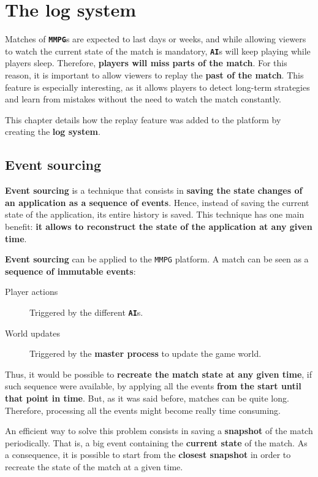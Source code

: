 \documentclass[a4paper,11pt,titlepage,abstract,numbers=noenddot,automark,mnsy,intlimits,rgb,dvipsnames]{report}
\begin{document}
\chapter{The log system}
\label{log_system}
Matches of \textbf{\texttt{MMPG}}s are expected to last days or weeks, and while allowing viewers to watch the current state of
the match is mandatory, \textbf{\texttt{AI}}s will keep playing while players sleep. Therefore, \textbf{players will miss parts of the match}.
For this reason, it is important to allow viewers to replay the \textbf{past of the match}. This feature is especially
interesting, as it allows players to detect long-term strategies and learn from mistakes without the need to watch the
match constantly.

This chapter details how the replay feature was added to the platform by creating the \textbf{log system}.
\section{Event sourcing}
\textbf{Event sourcing} \cite{event_sourcing} is a technique that consists in \textbf{saving the state changes of an application as a
sequence of events}. Hence, instead of saving the current state of the application, its entire history is saved. This technique
has one main benefit: \textbf{it allows to reconstruct the state of the application at any given time}.

\textbf{Event sourcing} can be applied to the \texttt{MMPG} platform. A match can be seen as a \textbf{sequence of immutable events}:
\begin{description}
\item[Player actions]
Triggered by the different \textbf{\texttt{AI}}s.
\item[World updates]
Triggered by the \textbf{master process} to update the game world.
\end{description}
Thus, it would be possible to \textbf{recreate the match state at any given time}, if such sequence were available, by applying
all the events \textbf{from the start until that point in time}. But, as it was said before, matches can be quite long. Therefore,
processing all the events might become really time consuming.

An efficient way to solve this problem consists in saving a \textbf{snapshot} of the match periodically. That is, a big event
containing the \textbf{current state} of the match. As a consequence, it is possible to start from the \textbf{closest snapshot} in order
to recreate the state of the match at a given time.
\end{document}
